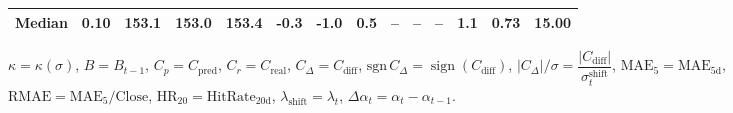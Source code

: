 \begin{threeparttable}
{\begin{tabular}{lrrrrrrrrrrrrr}
 Median &     0.10 & 153.1 & 153.0 & 153.4 &       -0.3 &                     -1.0 &                 0.5 &         -- &        -- &             -- &              1.1 &            0.73 &                  15.00 \\
\bottomrule
\end{tabular}
}
\begin{tablenotes}\footnotesize
\item $\kappa=\kappa(\sigma)$, $B=B_{t-1}$, $C_p=C_{\text{pred}}$, $C_r=C_{\text{real}}$, $C_\Delta=C_{\text{diff}}$, $\mathrm{sgn}\,C_\Delta=\operatorname{sign}(C_{\text{diff}})$, $|C_\Delta|/\sigma=\dfrac{|C_{\text{diff}}|}{\sigma_t^{\text{shift}}}$, $\mathrm{MAE}_5=\mathrm{MAE}_{5\text{d}}$, $\mathrm{RMAE}= \mathrm{MAE}_5 / \text{Close}$, $\mathrm{HR}_{20}=\mathrm{HitRate}_{20\text{d}}$, 
$\lambda_{\text{shift}}=\lambda_t$, 
$\Delta\alpha_t=\alpha_t-\alpha_{t-1}$.
\end{tablenotes}
\end{threeparttable}
\endgroup

